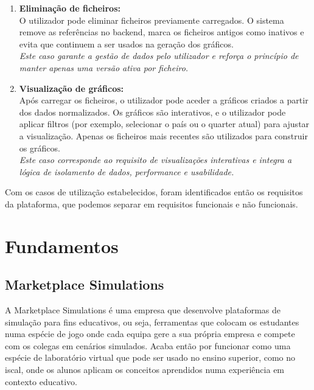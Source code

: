 \begin{enumerate}
    \item \textbf{Eliminação de ficheiros: } \\
    O utilizador pode eliminar ficheiros previamente carregados. O sistema remove as referências no backend, marca os ficheiros antigos como inativos e evita que continuem a ser usados na geração dos gráficos. \\
    \textit{Este caso garante a gestão de dados pelo utilizador e reforça o princípio de manter apenas uma versão ativa por ficheiro.}
    
    \item \textbf{Visualização de gráficos: } \\
    Após carregar os ficheiros, o utilizador pode aceder a gráficos criados a partir dos dados normalizados. Os gráficos são interativos, e o utilizador pode aplicar filtros (por exemplo, selecionar o país ou o quarter atual) para ajustar a visualização. Apenas os ficheiros mais recentes são utilizados para construir os gráficos. \\
    \textit{Este caso corresponde ao requisito de visualizações interativas e integra a lógica de isolamento de dados, performance e usabilidade.}
    
\end{enumerate}

Com os casos de utilização estabelecidos, foram identificados então os requisitos da plataforma, que podemos separar em requisitos funcionais e não funcionais.

\section{Fundamentos}
\label{sec:fundamentos}


\subsection{Marketplace Simulations}

A Marketplace Simulations  é uma empresa que desenvolve plataformas de simulação para fins educativos, ou seja, ferramentas que colocam os estudantes numa espécie de jogo onde cada equipa gere a sua própria empresa e compete com os colegas em cenários simulados. Acaba então por funcionar como uma espécie de laboratório virtual que pode ser usado no ensino superior, como no \gls{iscal}, onde os alunos aplicam os conceitos aprendidos numa experiência em contexto educativo.

